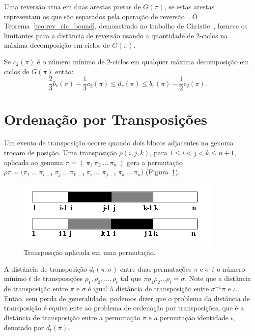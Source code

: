 Uma reversão atua em duas arestas pretas de $G(\pi)$, se estas arestas
representam os \bkp{} que são separados pela operação de
reversão~\cite{Christie*1998}. O Teorema~\ref{teo:rev_cic_bound},
demonstrado no trabalho de Christie~\cite{Christie*1998}, fornece os
limitantes para a distância de reversão usando a quantidade de
$2$-ciclos na máxima decomposição em ciclos de $G(\pi)$.

\begin{teo}
\label{teo:rev_cic_bound}
Se $c_{2}(\pi)$ é o número mínimo de $2$-ciclos em qualquer máxima
decomposição em ciclos de $G(\pi)$ então: 
\[
\frac{2}{3} b_r(\pi)
- \frac{1}{3} c_{2}(\pi) \leq d_r(\pi) \leq b_r(\pi) - \frac{1}{2}
c_{2}(\pi).
\]
\end{teo}

\section{Ordenação por Transposições}
\label{sec:trans}
Um evento de transposição ocorre quando dois blocos adjacentes no
genoma trocam de posição. Uma transposição $\rho(i, j, k)$, para
$1 \leq i < j < k \leq n + 1$, aplicada ao genoma $\pi =
(~\pi_{1}~\pi_{2}~\ldots~\pi_{n}~)$ gera a permutação $\rho\pi =
(\pi_{1}~\ldots~\pi_{i-1}~\pi_{j}~\ldots~\pi_{k-1}~\pi_{i}~\ldots$
$\pi_{j-1}~\pi_{k}~\ldots~\pi_{n})$ (Figura~\ref{fig:transposition}).

\begin{figure}[h]
  \centering
  \includegraphics{images/transposition.png} 
  \caption{Transposição aplicada em uma permutação.}
  \label{fig:transposition}
\end{figure}

A distância de transposição $d_{t}(\pi, \sigma)$ entre duas
permutações $\pi$ e $\sigma$ é o número mínimo $t$ de transposições
$\rho_{1}, \rho_{2}, \ldots, \rho_{t}$ tal que
$\pi \rho_{1} \rho_{2} \ldots \rho_{t} = \sigma$. Note que a distância
de transposição entre $\pi$ e $\sigma$ é igual à distância de transposição
entre $\sigma^{-1} \pi$ e $\iota$. Então, sem perda de generalidade,
podemos dizer que o problema da distância de transposição é
equivalente ao problema de ordenação por transposições, que é a
distância de transposição entre a permutação $\pi$ e a permutação
identidade $\iota$, denotado por $d_{t}(\pi)$.

